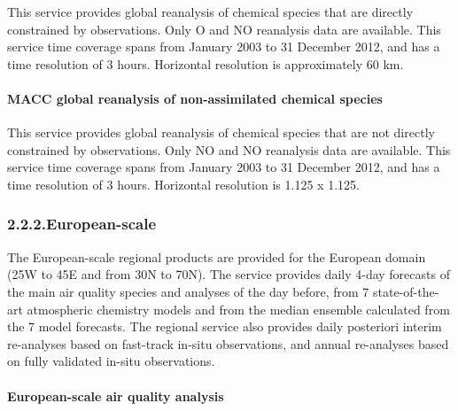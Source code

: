 \documentclass[9pt]{article}
\begin{document}
\noindent{}This service provides global reanalysis of chemical species that are directly constrained by observations.
Only O and NO reanalysis data are available. 
This service time coverage spans from January 2003 to 31 December 2012, and has a time resolution of 3 hours.
Horizontal resolution is approximately 60 km.%

\paragraph{MACC global reanalysis of non-assimilated chemical species}\label{sec-macc-global-reanalysis-of-non-assimilated-chemical-species}%

\noindent{}This service provides global reanalysis of chemical species that are not directly constrained by observations. 
Only NO and NO reanalysis data are available. 
This service time coverage spans from January 2003 to 31 December 2012, and has a time resolution of 3 hours.
Horizontal resolution is 1.125\textdegree{} x 1.125\textdegree{}.%

\subsubsection{2.2.2.\hspace*{0.5em}European-scale}\label{sec-european-scale}%

\noindent{}The European-scale regional products are provided for the European domain (25\textdegree{}W to 45\textdegree{}E and from 30\textdegree{}N to 70\textdegree{}N). 
The service provides daily 4-day forecasts of the main air quality species and analyses of the day before, from 7 state-of-the-art atmospheric chemistry models and from the median ensemble calculated from the 7 model forecasts. 
The regional service also provides daily posteriori interim re-analyses based on fast-track in-situ observations, and annual re-analyses based on fully validated in-situ observations.%

\paragraph{European-scale air quality analysis}\label{sec-european-scale-air-quality-analysis}%
\end{document}
